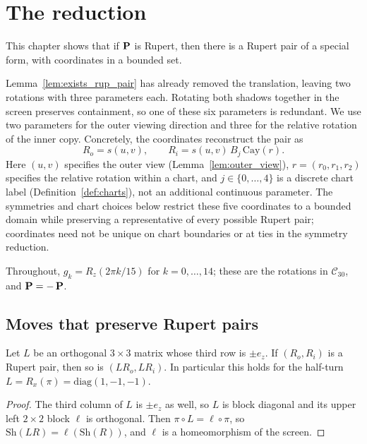 \chapter{The reduction}
\label{chap:reduction}

This chapter shows that if $\operatorname{\mathbf{P}}$ is Rupert, then there is a Rupert pair of a special
form, with coordinates in a bounded set.

Lemma~\ref{lem:exists_rup_pair} has already removed the translation,
leaving two rotations with three parameters each. Rotating both shadows together
in the screen preserves containment, so one of these six parameters is redundant.
We use two parameters for the outer viewing direction and three for the relative
rotation of the inner copy. Concretely, the coordinates reconstruct the pair as
\[
  R_o = s(u,v), \qquad R_i = s(u,v)\,B_j\,\mathrm{Cay}(r).
\]
Here $(u,v)$ specifies the outer view (Lemma~\ref{lem:outer_view}),
$r=(r_0,r_1,r_2)$ specifies the relative rotation within a chart, and
$j\in\{0,\dots,4\}$ is a discrete chart label
(Definition~\ref{def:charts}), not an additional continuous parameter.
The symmetries and chart choices below restrict these five coordinates to a bounded
domain while preserving a representative of every possible Rupert pair; coordinates
need not be unique on chart boundaries or at ties in the symmetry reduction.

Throughout,
$g_k = R_z(2\pi k/15)$ for $k = 0, \dots, 14$; these are the rotations in
$\mathcal{C}_{30}$, and $\operatorname{\mathbf{P}} = -\operatorname{\mathbf{P}}$.

\section{Moves that preserve Rupert pairs}

\begin{lemma}
\label{lem:move_left}
\leanok
{}
Let $L$ be an orthogonal $3 \times 3$ matrix whose third row is $\pm e_z$. If
$(R_o, R_i)$ is a Rupert pair, then so is $(L R_o, L R_i)$. In particular this holds for
the half-turn $L = R_x(\pi) = \mathrm{diag}(1, -1, -1)$.
\end{lemma}
\begin{proof}
\leanok
The third column of $L$ is $\pm e_z$ as well, so $L$ is block diagonal and its upper left
$2 \times 2$ block $\ell$ is orthogonal. Then $\pi \circ L = \ell \circ \pi$, so
$\mathrm{Sh}(L R) = \ell(\mathrm{Sh}(R))$, and $\ell$ is a homeomorphism of the screen.
\end{proof}

